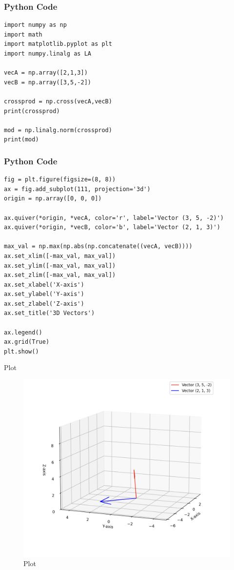 \documentclass{beamer}
\begin{document}
\begin{frame}[fragile]
    \frametitle{Python Code}
    \begin{lstlisting}
import numpy as np
import math
import matplotlib.pyplot as plt
import numpy.linalg as LA

vecA = np.array([2,1,3])
vecB = np.array([3,5,-2])

crossprod = np.cross(vecA,vecB)
print(crossprod)

mod = np.linalg.norm(crossprod)
print(mod)

\end{lstlisting}
\end{frame}

\begin{frame}[fragile]
    \frametitle{Python Code}

    \begin{lstlisting}
fig = plt.figure(figsize=(8, 8))
ax = fig.add_subplot(111, projection='3d')
origin = np.array([0, 0, 0])

ax.quiver(*origin, *vecA, color='r', label='Vector (3, 5, -2)')
ax.quiver(*origin, *vecB, color='b', label='Vector (2, 1, 3)')

max_val = np.max(np.abs(np.concatenate((vecA, vecB))))
ax.set_xlim([-max_val, max_val])
ax.set_ylim([-max_val, max_val])
ax.set_zlim([-max_val, max_val])
ax.set_xlabel('X-axis')
ax.set_ylabel('Y-axis')
ax.set_zlabel('Z-axis')
ax.set_title('3D Vectors')

ax.legend()
ax.grid(True)
plt.show()
    \end{lstlisting}
\end{frame}


\begin{frame}{Plot}
\begin{figure}
    \centering
    \includegraphics[width=0.8\columnwidth]{Figs/Figure_4.png}
    \caption{Plot}
    \label{fig:placeholder}
\end{figure}
\end{frame}
\end{document}
